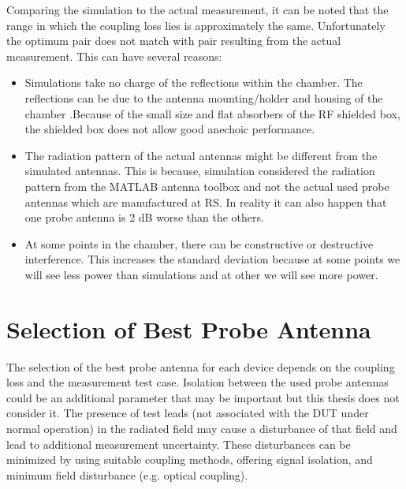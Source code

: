 Comparing the simulation to the actual measurement, it can be noted that the range in which the coupling loss lies is approximately the same. Unfortunately the optimum pair does not match with pair resulting from the actual measurement. This can have several reasons: 
\begin{itemize}
\item Simulations take no charge of the reflections within the chamber. The reflections can be due to the antenna mounting/holder and housing of the chamber .Because of the small size and flat absorbers of the \acs{RF} shielded box, the shielded box does not allow good anechoic performance.
\item The radiation pattern of the actual antennas might be different from the simulated antennas. This is because, simulation considered the radiation pattern from the MATLAB\textregistered{} antenna toolbox and not the actual used probe antennas which are manufactured at \acs{RS}\textregistered{}. In reality it can also happen that one probe antenna is 2 dB worse than the others. 
\item At some points in the chamber, there can be constructive or destructive interference. This increases the standard deviation because at some points we will see less power than simulations and at other we will see more power.
\end{itemize}







\section{Selection of Best Probe Antenna} \label{sec:sba}
The selection of the best probe antenna for each device depends on the coupling loss and the measurement test case. Isolation between the used probe antennas could be an additional parameter that may be important but this thesis does not consider it. The presence of test leads (not associated with the DUT under normal operation) in the radiated field may cause a disturbance of that field and lead to additional measurement uncertainty. These disturbances can be minimized by using suitable coupling methods, offering signal isolation, and minimum field disturbance (e.g. optical coupling). \\


